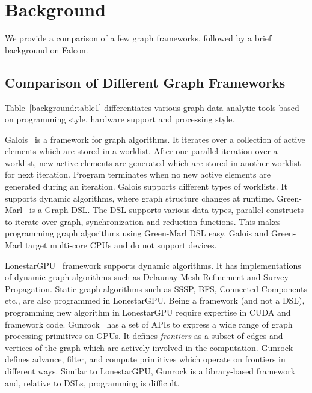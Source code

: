 \section{Background}\label{sec:background}
We provide a comparison of a few graph frameworks, followed by a brief background on Falcon.

\subsection{Comparison of Different Graph Frameworks}
Table~\ref{background:table1} differentiates various graph data analytic tools based on programming style, hardware support and processing style. 

 Galois~\cite{Pingali:2011:TPA:1993316.1993501} is a framework for graph algorithms.
It iterates over a collection  of active elements which are stored in a worklist.
After one parallel iteration over a worklist, new active elements are generated which are stored in another worklist for next iteration.
Program terminates when no new active elements are generated during an iteration.
Galois supports different types of worklists. It supports dynamic algorithms, where graph structure changes at runtime.
Green-Marl~\cite{Hong:2012:GDE:2150976.2151013} is a Graph DSL. 
The DSL supports various  data types,  parallel constructs to  iterate over graph, synchronization and reduction functions. 
This makes programming  graph algorithms using Green-Marl DSL easy.  
Galois and Green-Marl target multi-core CPUs and do not support \GPU devices.

LonestarGPU~\cite{nasre13:MAG:2517327.2442531} framework supports  dynamic algorithms. %
It has  implementations of dynamic graph algorithms such as Delaunay
Mesh Refinement and Survey Propagation. Static graph algorithms such as SSSP, BFS, Connected Components etc., are also programmed in LonestarGPU.
Being a framework (and not a DSL), programming new algorithm in LonestarGPU require expertise in CUDA and  framework code. 
Gunrock~\cite{Wang:2016:GHG:3016078.2851145} has a set of APIs to express a
wide range of graph processing primitives on GPUs. %
It defines {\it frontiers} as a subset of edges and vertices of the graph which are actively involved
in the computation. Gunrock defines \textsf{advance}, \textsf{filter}, and \textsf{compute} primitives which operate on
frontiers in different ways. 
Similar to LonestarGPU, Gunrock is a library-based framework and, relative to DSLs, programming is difficult. 

